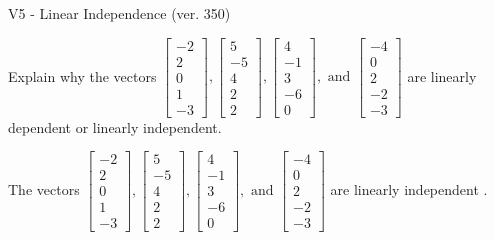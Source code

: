 \begin{exercise}
  \begin{exerciseTitle}V5 - Linear Independence (ver. 350)\end{exerciseTitle}
  \begin{exerciseStatement}
    Explain why the vectors \(\left[\begin{array}{r}
-2 \\
2 \\
0 \\
1 \\
-3
\end{array}\right] , \left[\begin{array}{r}
5 \\
-5 \\
4 \\
2 \\
2
\end{array}\right] , \left[\begin{array}{r}
4 \\
-1 \\
3 \\
-6 \\
0
\end{array}\right] , \text{ and } \left[\begin{array}{r}
-4 \\
0 \\
2 \\
-2 \\
-3
\end{array}\right]\) are linearly dependent or linearly independent.	


  \end{exerciseStatement}
  \begin{exerciseAnswer}
   The vectors \(\left[\begin{array}{r}
-2 \\
2 \\
0 \\
1 \\
-3
\end{array}\right] , \left[\begin{array}{r}
5 \\
-5 \\
4 \\
2 \\
2
\end{array}\right] , \left[\begin{array}{r}
4 \\
-1 \\
3 \\
-6 \\
0
\end{array}\right] , \text{ and } \left[\begin{array}{r}
-4 \\
0 \\
2 \\
-2 \\
-3
\end{array}\right]\) are 
  	 linearly independent  .
  


  \end{exerciseAnswer}
\end{exercise}